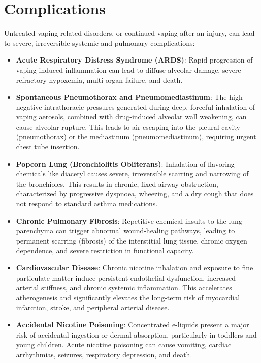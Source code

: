 \section*{Complications}
Untreated vaping-related disorders, or continued vaping after an injury, can lead to severe, irreversible systemic and pulmonary complications:
\begin{itemize}
    \item \textbf{Acute Respiratory Distress Syndrome (ARDS)}: Rapid progression of vaping-induced inflammation can lead to diffuse alveolar damage, severe refractory hypoxemia, multi-organ failure, and death.
    \item \textbf{Spontaneous Pneumothorax and Pneumomediastinum}: The high negative intrathoracic pressures generated during deep, forceful inhalation of vaping aerosols, combined with drug-induced alveolar wall weakening, can cause alveolar rupture. This leads to air escaping into the pleural cavity (pneumothorax) or the mediastinum (pneumomediastinum), requiring urgent chest tube insertion.
    \item \textbf{Popcorn Lung (Bronchiolitis Obliterans)}: Inhalation of flavoring chemicals like diacetyl causes severe, irreversible scarring and narrowing of the bronchioles. This results in chronic, fixed airway obstruction, characterized by progressive dyspnoea, wheezing, and a dry cough that does not respond to standard asthma medications.
    \item \textbf{Chronic Pulmonary Fibrosis}: Repetitive chemical insults to the lung parenchyma can trigger abnormal wound-healing pathways, leading to permanent scarring (fibrosis) of the interstitial lung tissue, chronic oxygen dependence, and severe restriction in functional capacity.
    \item \textbf{Cardiovascular Disease}: Chronic nicotine inhalation and exposure to fine particulate matter induce persistent endothelial dysfunction, increased arterial stiffness, and chronic systemic inflammation. This accelerates atherogenesis and significantly elevates the long-term risk of myocardial infarction, stroke, and peripheral arterial disease.
    \item \textbf{Accidental Nicotine Poisoning}: Concentrated e-liquids present a major risk of accidental ingestion or dermal absorption, particularly in toddlers and young children. Acute nicotine poisoning can cause vomiting, cardiac arrhythmias, seizures, respiratory depression, and death.
\end{itemize}

